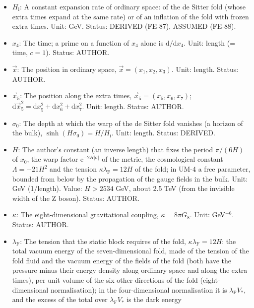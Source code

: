 \documentclass[
  10pt,
]{article}
\begin{document}
\begin{itemize}
  \(\mathrm{e}^{X}\) is the exponential of \(X\). Unit: dimensionless.
  Value: 2.718281828. Status: STANDARD.
\item
  \(H_{\mathrm{i}}\): A constant expansion rate of ordinary space: of
  the de Sitter fold (whose extra times expand at the same rate) or of
  an inflation of the fold with frozen extra times. Unit: GeV. Status:
  DERIVED (FE-87), ASSUMED (FE-88).
\item
  \(x_4\): The time; a prime on a function of \(x_4\) alone is
  \(\mathrm{d}/\mathrm{d}x_4\). Unit: length (= time, \(c = 1\)).
  Status: AUTHOR.
\item
  \(\vec x\): The position in ordinary space,
  \(\vec x = (x_1, x_2, x_3)\). Unit: length. Status: AUTHOR.
\item
  \(\vec x_5\): The position along the extra times,
  \(\vec x_5 = (x_5, x_6, x_7)\);
  \(\mathrm{d}\vec x_5^2 = \mathrm{d}x_5^2 + \mathrm{d}x_6^2 + \mathrm{d}x_7^2\).
  Unit: length. Status: AUTHOR.
\item
  \(\sigma_0\): The depth at which the warp of the de Sitter fold
  vanishes (a horizon of the bulk),
  \(\sinh(H\sigma_0) = H/H_{\mathrm{i}}\). Unit: length. Status:
  DERIVED.
\item
  \(H\): The author's constant (an inverse length) that fixes the period
  \(\pi/(6H)\) of \(x_0\), the warp factor
  \(\mathrm{e}^{-2H\lvert\sigma\rvert}\) of the metric, the cosmological
  constant \(\Lambda = -21H^2\) and the tension
  \(\kappa\lambda_{\mathrm{F}} = 12H\) of the fold; in UM-4 a free
  parameter, bounded from below by the propagation of the gauge fields
  in the bulk. Unit: GeV (1/length). Value: \(H > 2534\) GeV, about 2.5
  TeV (from the invisible width of the Z boson). Status: AUTHOR.
\item
  \(\kappa\): The eight-dimensional gravitational coupling,
  \(\kappa = 8\pi G_8\). Unit: GeV\(^{-6}\). Status: AUTHOR.
\item
  \(\lambda_{\mathrm{F}}\): The tension that the static block requires
  of the fold, \(\kappa\lambda_{\mathrm{F}} = 12H\): the total vacuum
  energy of the seven-dimensional fold, made of the tension of the fold
  fluid and the vacuum energy of the fields of the fold (both have the
  pressure minus their energy density along ordinary space and along the
  extra times), per unit volume of the six other directions of the fold
  (eight-dimensional normalisation); in the four-dimensional
  normalisation it is \(\lambda_{\mathrm{F}}V_*\), and the excess of the
  total over \(\lambda_{\mathrm{F}}V_*\) is the dark energy

\end{itemize}
\end{document}
